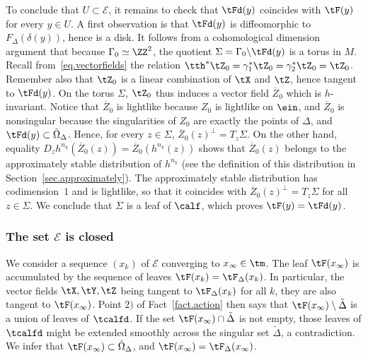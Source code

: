To conclude that $U \subset {\mathcal E}$, it remains to check that $\tFd(y)$ coincides with $\tF(y)$ for every $y \in U$. A first observation is that $\tFd(y)$ is diffeomorphic to $F_{\Delta}(\delta(y))$, hence is a disk. It follows from a cohomological dimension argument that because $\Gamma_{0} \simeq \ZZ^2$, the quotient $\Sigma=\Gamma_{0} \backslash
\tFd(y)$ is a torus in $M$. Recall from~\eqref{eq.vectorfields} the relation $\tth^*\tZ_0=\gamma_1^*\tZ_0=\gamma_2^* \tZ_0=\tZ_0$. Remember also that $\tZ_0$ is a linear combination of $\tX$ and $\tZ$, hence tangent to $\tFd(y)$. On the torus $\Sigma$, $\tZ_0$ thus induces a vector field $\overline{Z}_0$ which is $h$-invariant. Notice that $\overline{Z}_0$ is lightlike because $Z_0$ is lightlike on $\ein$, and $\overline{Z}_0$ is nonsingular because the singularities of $Z_0$ are exactly the points of $\Delta$, and $\tFd(y) \subset \tilde{\Omega}_{\Delta}$. Hence, for every $z \in \Sigma$, $\overline{Z}_0(z)^{\perp}=T_z \Sigma$. On the other hand, equality $D_zh^{n_k}(\overline{Z}_0(z))=\overline{Z}_0(h^{n_k}(z))$ shows that $\overline{Z}_0(z)$ belongs to the approximately stable distribution of $h^{n_k}$ (see the definition of this distribution in Section~\ref{sec.approximately}). The approximately stable distribution has codimension~$1$ and is lightlike, so that it coincides with $\overline{Z}_0(z)^{\perp}=T_z\Sigma$ for all $z \in \Sigma$. We conclude that $\Sigma$ is a leaf of $\calf$, which proves $\tF(y)=\tFd(y)$.



\subsubsection{The set \texorpdfstring{$\mathcal{E}$}{E} is closed}\label{sec.closed}
We consider a sequence $(x_k)$ of ${\mathcal E}$ converging to $x_{\infty} \in \tm$. The leaf $\tF(x_{\infty})$ is accumulated by the sequence of leaves $\tF(x_k)=\tF_{\Delta}(x_k)$. In particular, the vector fields $\tX,\tY,\tZ$ being tangent to $\tF_{\Delta}(x_k)$ for all $k$, they are also tangent to $\tF(x_{\infty})$. Point $2)$ of Fact~\ref{fact.action} then says that $\tF(x_{\infty}) \setminus \tilde{\Delta}$ is a union of leaves of $\tcalfd$. If the set $\tF(x_{\infty}) \cap \tilde{\Delta}$ is not empty, those leaves of $\tcalfd$ might be extended smoothly across the singular set $\tilde{\Delta}$, a contradiction. We infer that $\tF(x_{\infty}) \subset \tilde{\Omega}_{\Delta}$, and $\tF(x_{\infty})=\tF_{\Delta}(x_{\infty})$.

